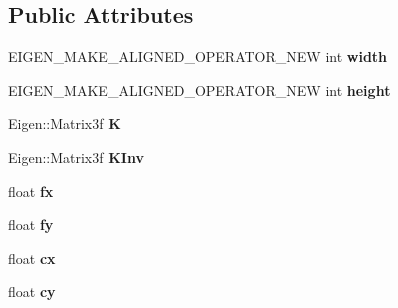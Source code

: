 \subsection*{Public Attributes}
\begin{DoxyCompactItemize}
\item 
\hypertarget{classlsd__slam_1_1_s_e3_tracker_a1b49a9387602c5bc255c6536651b37b5}{E\-I\-G\-E\-N\-\_\-\-M\-A\-K\-E\-\_\-\-A\-L\-I\-G\-N\-E\-D\-\_\-\-O\-P\-E\-R\-A\-T\-O\-R\-\_\-\-N\-E\-W int {\bfseries width}}\label{classlsd__slam_1_1_s_e3_tracker_a1b49a9387602c5bc255c6536651b37b5}

\item 
\hypertarget{classlsd__slam_1_1_s_e3_tracker_a4112b73babf2a7c917c530b0950129ce}{E\-I\-G\-E\-N\-\_\-\-M\-A\-K\-E\-\_\-\-A\-L\-I\-G\-N\-E\-D\-\_\-\-O\-P\-E\-R\-A\-T\-O\-R\-\_\-\-N\-E\-W int {\bfseries height}}\label{classlsd__slam_1_1_s_e3_tracker_a4112b73babf2a7c917c530b0950129ce}

\item 
\hypertarget{classlsd__slam_1_1_s_e3_tracker_aac394896bdb19a1b9f65765374f50466}{Eigen\-::\-Matrix3f {\bfseries K}}\label{classlsd__slam_1_1_s_e3_tracker_aac394896bdb19a1b9f65765374f50466}

\item 
\hypertarget{classlsd__slam_1_1_s_e3_tracker_a1b0051e57e846cc114da524928f2bc57}{Eigen\-::\-Matrix3f {\bfseries K\-Inv}}\label{classlsd__slam_1_1_s_e3_tracker_a1b0051e57e846cc114da524928f2bc57}

\item 
\hypertarget{classlsd__slam_1_1_s_e3_tracker_a2264c4f7199d450b8ce44c4349740de2}{float {\bfseries fx}}\label{classlsd__slam_1_1_s_e3_tracker_a2264c4f7199d450b8ce44c4349740de2}

\item 
\hypertarget{classlsd__slam_1_1_s_e3_tracker_a0eb3aaf98656d286869ed6b7917df43a}{float {\bfseries fy}}\label{classlsd__slam_1_1_s_e3_tracker_a0eb3aaf98656d286869ed6b7917df43a}

\item 
\hypertarget{classlsd__slam_1_1_s_e3_tracker_ac7e6d6ce010df3cded56eb85aa655fe2}{float {\bfseries cx}}\label{classlsd__slam_1_1_s_e3_tracker_ac7e6d6ce010df3cded56eb85aa655fe2}

\item 
\hypertarget{classlsd__slam_1_1_s_e3_tracker_ab4d871dd945c23c4f185c33041a2975b}{float {\bfseries cy}}\label{classlsd__slam_1_1_s_e3_tracker_ab4d871dd945c23c4f185c33041a2975b}


\end{DoxyCompactItemize}
